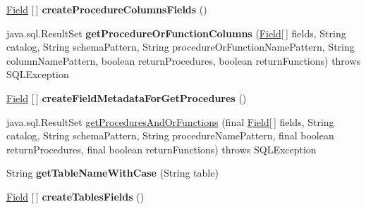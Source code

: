 \begin{DoxyCompactItemize}
\item 
\mbox{\label{classcom_1_1mysql_1_1jdbc_1_1_database_meta_data_a9225f4b3c3bac62f9f7be2a129272ba4}} 
\mbox{\hyperlink{classcom_1_1mysql_1_1jdbc_1_1_field}{Field}} \mbox{[}$\,$\mbox{]} {\bfseries create\+Procedure\+Columns\+Fields} ()
\item 
\mbox{\label{classcom_1_1mysql_1_1jdbc_1_1_database_meta_data_a151c8caec6103bfca34a91bba952a9f7}} 
java.\+sql.\+Result\+Set {\bfseries get\+Procedure\+Or\+Function\+Columns} (\mbox{\hyperlink{classcom_1_1mysql_1_1jdbc_1_1_field}{Field}}\mbox{[}$\,$\mbox{]} fields, String catalog, String schema\+Pattern, String procedure\+Or\+Function\+Name\+Pattern, String column\+Name\+Pattern, boolean return\+Procedures, boolean return\+Functions)  throws S\+Q\+L\+Exception 
\item 
\mbox{\label{classcom_1_1mysql_1_1jdbc_1_1_database_meta_data_ac5699508622cc08559f95e210b125890}} 
\mbox{\hyperlink{classcom_1_1mysql_1_1jdbc_1_1_field}{Field}} \mbox{[}$\,$\mbox{]} {\bfseries create\+Field\+Metadata\+For\+Get\+Procedures} ()
\item 
java.\+sql.\+Result\+Set \mbox{\hyperlink{classcom_1_1mysql_1_1jdbc_1_1_database_meta_data_a677ceef89a15533d6f1aa37bb7074752}{get\+Procedures\+And\+Or\+Functions}} (final \mbox{\hyperlink{classcom_1_1mysql_1_1jdbc_1_1_field}{Field}}\mbox{[}$\,$\mbox{]} fields, String catalog, String schema\+Pattern, String procedure\+Name\+Pattern, final boolean return\+Procedures, final boolean return\+Functions)  throws S\+Q\+L\+Exception 
\item 
\mbox{\label{classcom_1_1mysql_1_1jdbc_1_1_database_meta_data_aef5d0a47744901f59189dca69df1314c}} 
String {\bfseries get\+Table\+Name\+With\+Case} (String table)
\item 
\mbox{\label{classcom_1_1mysql_1_1jdbc_1_1_database_meta_data_a89fdc7dbcc89ec7c6a0ef366af79c7a5}} 
\mbox{\hyperlink{classcom_1_1mysql_1_1jdbc_1_1_field}{Field}} \mbox{[}$\,$\mbox{]} {\bfseries create\+Tables\+Fields} ()
\item 
\mbox{\label{classcom_1_1mysql_1_1jdbc_1_1_database_meta_data_ae60ccae8808606fc3b504e210b917247}} 

\end{DoxyCompactItemize}
